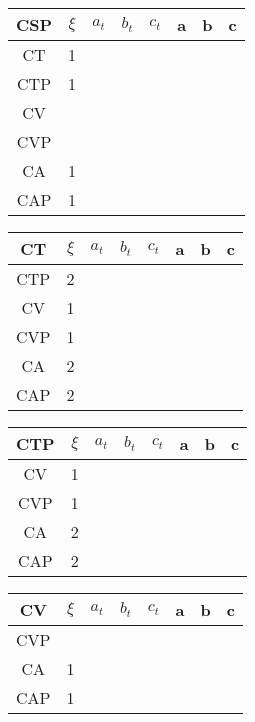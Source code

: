 \documentclass[twocolumn]{article}
\begin{document}
\begin{table}[H]
	\begin{tabular}{|c|c|c|c|c|c|c|c|}
		\hline
		CSP & $\xi $& $a_t$ & $b_t$ & $c_t$ & a & b & c \\
		\hline
		CT & 1 &   &   &   &   &   &   \\
		\hline
		CTP & 1 &   &   &   &   &   &   \\
		\hline
		CV &   &   &   &   &   &   &   \\
		\hline
		CVP &   &   &   &   &   &   &   \\
		\hline
		CA & 1 &   &   &   &   &   &   \\
		\hline
		CAP & 1 &   &   &   &   &   &   \\
		\hline
	\end{tabular}
\end{table}

\begin{table}[H]
	\begin{tabular}{|c|c|c|c|c|c|c|c|}
		\hline
		CT & $\xi $& $a_t$ & $b_t$ & $c_t$ & a & b & c \\
		\hline
		CTP & 2 &   &   &   &   &   &   \\
		\hline
		CV & 1 &   &   &   &   &   &   \\
		\hline
		CVP & 1 &   &   &   &   &   &   \\
		\hline
		CA & 2 &   &   &   &   &   &   \\
		\hline
		CAP & 2 &   &   &   &   &   &   \\
		\hline
	\end{tabular}
\end{table}

\begin{table}[H]
	\begin{tabular}{|c|c|c|c|c|c|c|c|}
		\hline
		CTP & $\xi $& $a_t$ & $b_t$ & $c_t$ & a & b & c \\
		\hline
		CV & 1 &   &   &   &   &   &   \\
		\hline
		CVP & 1 &   &   &   &   &   &   \\
		\hline
		CA & 2 &   &   &   &   &   &   \\
		\hline
		CAP & 2 &   &   &   &   &   &   \\
		\hline
	\end{tabular}
\end{table}

\begin{table}[H]
	\begin{tabular}{|c|c|c|c|c|c|c|c|}
		\hline
		CV & $\xi $& $a_t$ & $b_t$ & $c_t$ & a & b & c \\
		\hline
		CVP &   &   &   &   &   &   &   \\
		\hline
		CA & 1 &   &   &   &   &   &   \\
		\hline
		CAP & 1 &   &   &   &   &   &   \\
		\hline
	\end{tabular}
\end{table}
\end{document}
